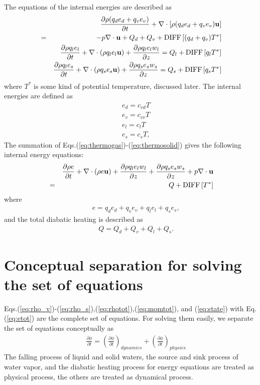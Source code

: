 The equations of the internal energies are described as
\begin{eqnarray}
&&  \frac{\partial \rho (q_d e_d + q_v e_v) }{\partial t} +
  \nabla \cdot \left[ \rho (q_d e_d + q_v e_v ){\bf u} \right] \nonumber\\
&=& - p \nabla \cdot {\bf u} + Q_{d}+ Q_{v} + {\rm DIFF}\left[(q_d+q_v)T^{*} \right]
\label{eq:thermogas}\\
&&  \frac{\partial \rho q_l e_l}{\partial t} +
  \nabla \cdot \left( \rho q_l e_l {\bf u} \right)
+ \frac{\partial \rho q_l e_l w_l}{\partial z}
= Q_l + {\rm DIFF}\left[q_l T^{*} \right]
\label{eq:thermoliquid}\\
&&  \frac{\partial \rho q_l e_s}{\partial t} +
  \nabla \cdot \left( \rho q_s e_s {\bf u} \right)
+ \frac{\partial \rho q_s e_s w_s}{\partial z}
= Q_s + {\rm DIFF}\left[q_s T^{*} \right]
\label{eq:thermosolid}
\end{eqnarray}
where $T^*$ is some kind of potential temperature, discussed later.
The internal energies are defined as
\begin{eqnarray}
&& e_d = c_{vd} T\\
&& e_v = c_{vv} T\\
&& e_l = c_{l} T\\
&& e_s = c_{s} T,
\end{eqnarray}
The summation of Eqs.(\ref{eq:thermogas})-(\ref{eq:thermosolid})
gives the following internal energy equations:
\begin{eqnarray}
&&  \frac{\partial \rho e  }{\partial t}
+  \nabla \cdot \left( \rho e {\bf u} \right)
+ \frac{\partial \rho q_l e_l w_l}{\partial z}
 + \frac{\partial \rho q_s e_s w_s}{\partial z}
 + p \nabla \cdot {\bf u}\nonumber\\
&=&  Q + {\rm DIFF}\left[T^{*} \right]
\label{eq:etot}
\end{eqnarray}
where
\begin{eqnarray}
&&  e = q_d e_d + q_v e_v + q_l e_l + q_s e_s,
\end{eqnarray}
and the total diabatic heating is described as
\begin{eqnarray}
&&  Q = Q_d + Q_v + Q_l + Q_s.
\end{eqnarray}

\section{Conceptual separation for solving the set of equations}

Eqs.(\ref{eq:rho_v})-(\ref{eq:rho_s}),(\ref{eq:rhotot}),(\ref{eq:momtot}),
and (\ref{eq:state}) with Eq.(\ref{eq:etot}) are the complete set of equations.
For solving them easily, we separate the set of equations conceptually as
\begin{eqnarray}
&&  \frac{\partial \phi}{\partial t} =
\left(\frac{\partial \phi}{\partial t}\right)_{dynamics}
+\left(\frac{\partial \phi}{\partial t}\right)_{physics}
\end{eqnarray}
The falling process of liquid and solid waters,
the source and sink process of water vapor, and
the diabatic heating process for energy equations are treated
as physical process, the others are treated as dynamical process.


